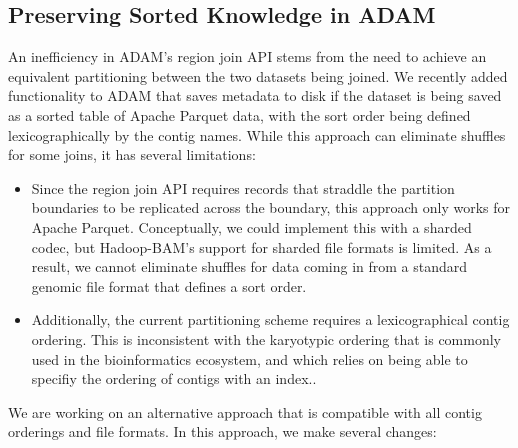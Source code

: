 \documentclass[phd]{ucbthesis}
\begin{document}
\subsection{Preserving Sorted Knowledge in {ADAM}}
\label{sec:sorted-knowledge}

An inefficiency in {ADAM}'s region join API stems from the need to
achieve an equivalent partitioning between the two datasets being joined. We
recently added functionality to {ADAM} that saves metadata to disk if the
dataset is being saved as a sorted table of {Apache Parquet} data, with
the sort order being defined lexicographically by the contig names. While this
approach can eliminate shuffles for some joins, it has several limitations:

\begin{itemize}
\item Since the region join API requires records that straddle the partition
  boundaries to be replicated across the boundary, this approach only works for
  {Apache Parquet}. Conceptually, we could implement this with a sharded
  codec, but {Hadoop-BAM}'s support for sharded file formats is limited.
  As a result, we cannot eliminate shuffles for data coming in from a standard
  genomic file format that defines a sort order.
\item Additionally, the current partitioning scheme requires a lexicographical
  contig ordering. This is inconsistent with the karyotypic ordering that is
  commonly used in the bioinformatics ecosystem, and which relies on being
  able to specifiy the ordering of contigs with an index..
\end{itemize}

We are working on an alternative approach that is compatible with all contig
orderings and file formats. In this approach, we make several changes:
\end{document}
